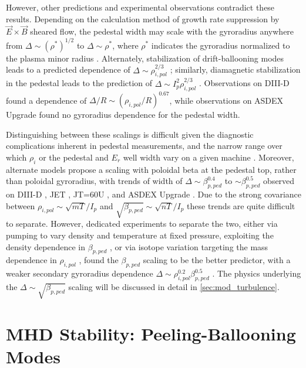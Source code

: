 However, other predictions and experimental observations contradict these results.  Depending on the calculation method of growth rate suppression by $\vec{E}\times\vec{B}$ sheared flow, the pedestal width may scale with the gyroradius anywhere from $\Delta \sim \left(\rho^*\right)^{1/2}$ to $\Delta \sim \rho^*$, where $\rho^*$ indicates the gyroradius normalized to the plasma minor radius \cite{Onjun2002,Beurskens2011}.  Alternately, stabilization of drift-ballooning modes leads to a predicted dependence of $\Delta \sim \rho_{i,pol}^{2/3}$ \cite{Wilson1997}; similarly, diamagnetic stabilization in the pedestal leads to the prediction of $\Delta \sim I_p^2 \rho_{i,pol}^{2/3}$ \cite{Rogers1999}.  Observations on DIII-D \cite{Osborne1998} found a dependence of $\Delta/R \sim (\rho_{i,pol}/R)^{0.67}$, while observations on ASDEX Upgrade \cite{Beurskens2011,Suttrop2000a} found no gyroradius dependence for the pedestal width.

Distinguishing between these scalings is difficult given the diagnostic complications inherent in pedestal measurements, and the narrow range over which $\rho_i$ or the pedestal and $E_r$ well width vary on a given machine \cite{Gohil1998,Maggi2010}.  Moreover, alternate models propose a scaling with poloidal beta at the pedestal top, rather than poloidal gyroradius, with trends of width of $\Delta \sim \beta_{p,ped}^{0.4}$ to $\sim \beta_{p,ped}^{0.5}$ observed on DIII-D \cite{Osborne1998,Groebner1998a}, JET \cite{Maggi2010}, JT=60U \cite{Urano2008}, and ASDEX Upgrade \cite{Beurskens2011}.  Due to the strong covariance between $\rho_{i,pol} \sim \sqrt{mT}/I_p$ and $\sqrt{\beta_{p,ped}} \sim \sqrt{nT}/I_p$ these trends are quite difficult to separate.  However, dedicated experiments to separate the two, either via pumping to vary density and temperature at fixed pressure, exploiting the density dependence in $\beta_{p,ped}$ \cite{Osborne1998}, or via isotope variation targeting the mass dependence in $\rho_{i,pol}$ \cite{Urano2008,Saibene1999}, found the $\beta_{p,ped}$ scaling to be the better predictor, with a weaker secondary gyroradius dependence $\Delta \sim \rho_{i,pol}^{0.2} \beta_{p,ped}^{0.5}$ \cite{Urano2008,Maggi2010}.  The physics underlying the $\Delta \sim \sqrt{\beta_{p,ped}}$ scaling will be discussed in detail in \cref{sec:mod_turbulence}.\nicesectionending

\section{MHD Stability: Peeling-Ballooning Modes}\label{sec:mod_pb}

